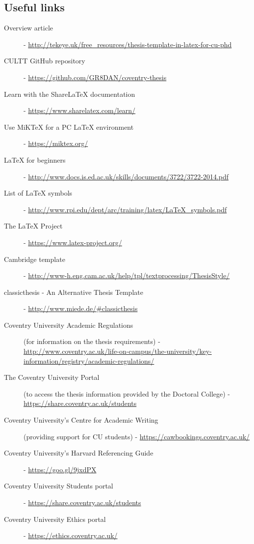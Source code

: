 \subsection*{Useful links}
\begin{description}
\item[Overview article] - \url{http://tekeye.uk/free_resources/thesis-template-in-latex-for-cu-phd}
\item[CULTT GitHub repository] - \url{https://github.com/GR8DAN/coventry-thesis}
\item[Learn with the ShareLaTeX documentation] - \url{https://www.sharelatex.com/learn/}
\item[Use MiKTeX for a PC \LaTeX{} environment] - \url{https://miktex.org/}
\item[\LaTeX{} for beginners] - \url{http://www.docs.is.ed.ac.uk/skills/documents/3722/3722-2014.pdf}
\item[List of LaTeX symbols] - \url{http://www.rpi.edu/dept/arc/training/latex/LaTeX_symbols.pdf}
\item[The \LaTeX{} Project] - \url{https://www.latex-project.org/}
\item[Cambridge template] - \url{http://www-h.eng.cam.ac.uk/help/tpl/textprocessing/ThesisStyle/}
\item[classicthesis - An Alternative Thesis Template] - \url{http://www.miede.de/#classicthesis}
\item[Coventry University Academic Regulations] (for information on the thesis requirements)
- \url{http://www.coventry.ac.uk/life-on-campus/the-university/key-information/registry/academic-regulations/}
\item[The Coventry University Portal] (to access the thesis information provided by the Doctoral College)
- \url{https://share.coventry.ac.uk/students}
\item[Coventry University's Centre for Academic Writing] (providing support for CU students) - \url{https://cawbookings.coventry.ac.uk/}
\item[Coventry University's Harvard Referencing Guide]
- \url{https://goo.gl/9jxdPX}
\item[Coventry University Students portal] - \url{https://share.coventry.ac.uk/students}
\item[Coventry University Ethics portal] - \url{https://ethics.coventry.ac.uk/}
\end{description}
